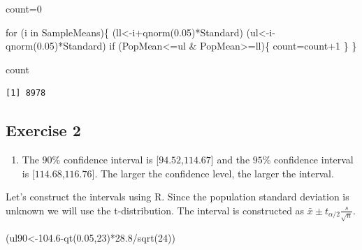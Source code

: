 \documentclass[
  letterpaper,
  DIV=11,
  numbers=noendperiod]{scrreprt}
\newenvironment{Shaded}{\begin{snugshade}}{\end{snugshade}}
\newcommand{\ControlFlowTok}[1]{\textcolor[rgb]{0.00,0.23,0.31}{#1}}
\newcommand{\DecValTok}[1]{\textcolor[rgb]{0.68,0.00,0.00}{#1}}
\newcommand{\FloatTok}[1]{\textcolor[rgb]{0.68,0.00,0.00}{#1}}
\newcommand{\FunctionTok}[1]{\textcolor[rgb]{0.28,0.35,0.67}{#1}}
\newcommand{\NormalTok}[1]{\textcolor[rgb]{0.00,0.23,0.31}{#1}}
\newcommand{\OtherTok}[1]{\textcolor[rgb]{0.00,0.23,0.31}{#1}}
\newcommand{\SpecialCharTok}[1]{\textcolor[rgb]{0.37,0.37,0.37}{#1}}
\providecommand{\tightlist}{%
  \setlength{\itemsep}{0pt}\setlength{\parskip}{0pt}}\usepackage{longtable,booktabs,array}
\begin{document}
\begin{Shaded}
\begin{Highlighting}[numbers=left,,]
\NormalTok{count}\OtherTok{=}\DecValTok{0}

\ControlFlowTok{for}\NormalTok{ (i }\ControlFlowTok{in}\NormalTok{ SampleMeans)\{}
\NormalTok{  (ll}\OtherTok{\textless{}{-}}\NormalTok{i}\SpecialCharTok{+}\FunctionTok{qnorm}\NormalTok{(}\FloatTok{0.05}\NormalTok{)}\SpecialCharTok{*}\NormalTok{Standard)}
\NormalTok{  (ul}\OtherTok{\textless{}{-}}\NormalTok{i}\SpecialCharTok{{-}}\FunctionTok{qnorm}\NormalTok{(}\FloatTok{0.05}\NormalTok{)}\SpecialCharTok{*}\NormalTok{Standard)}
  \ControlFlowTok{if}\NormalTok{ (PopMean}\SpecialCharTok{\textless{}=}\NormalTok{ul }\SpecialCharTok{\&}\NormalTok{ PopMean}\SpecialCharTok{\textgreater{}=}\NormalTok{ll)\{}
\NormalTok{    count}\OtherTok{=}\NormalTok{count}\SpecialCharTok{+}\DecValTok{1}
\NormalTok{  \}}
\NormalTok{\}}

\NormalTok{count}
\end{Highlighting}
\end{Shaded}

\begin{verbatim}
[1] 8978
\end{verbatim}

\hypertarget{exercise-2-23}{%
\subsection*{Exercise 2}\label{exercise-2-23}}

\begin{enumerate}
\def\labelenumi{\arabic{enumi}.}
\tightlist
\item
  The \(90\)\% confidence interval is {[}\(94.52\),\(114.67\){]} and the
  \(95\)\% confidence interval is {[}\(114.68\),\(116.76\){]}. The
  larger the confidence level, the larger the interval.
\end{enumerate}

Let's construct the intervals using R. Since the population standard
deviation is unknown we will use the t-distribution. The interval is
constructed as \(\bar{x}\pm t_{\alpha/2} \frac{s}{\sqrt{n}}\).

\begin{Shaded}
\begin{Highlighting}[numbers=left,,]
\NormalTok{(ul90}\OtherTok{\textless{}{-}}\FloatTok{104.6}\SpecialCharTok{{-}}\FunctionTok{qt}\NormalTok{(}\FloatTok{0.05}\NormalTok{,}\DecValTok{23}\NormalTok{)}\SpecialCharTok{*}\FloatTok{28.8}\SpecialCharTok{/}\FunctionTok{sqrt}\NormalTok{(}\DecValTok{24}\NormalTok{))}
\end{Highlighting}
\end{Shaded}
\end{document}
